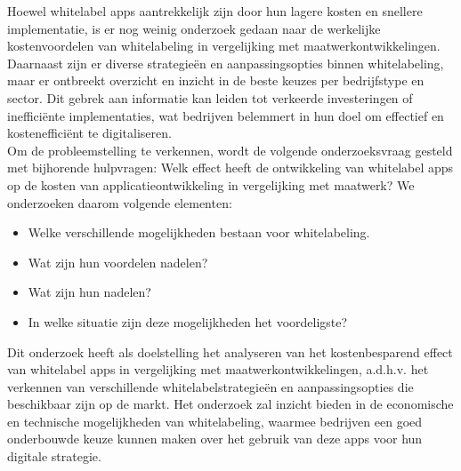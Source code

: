 Hoewel whitelabel apps aantrekkelijk zijn door hun lagere kosten en snellere implementatie, is er nog weinig onderzoek gedaan naar de werkelijke kostenvoordelen van whitelabeling in vergelijking met maatwerkontwikkelingen. 
Daarnaast zijn er diverse strategieën en aanpassingsopties binnen whitelabeling, maar er ontbreekt overzicht en inzicht in de beste keuzes per bedrijfstype en sector. 
Dit gebrek aan informatie kan leiden tot verkeerde investeringen of inefficiënte implementaties, wat bedrijven belemmert in hun doel om effectief en kostenefficiënt te digitaliseren.\\

Om de probleemstelling te verkennen, wordt de volgende onderzoeksvraag gesteld met bijhorende hulpvragen:
Welk effect heeft de ontwikkeling van whitelabel apps op de kosten van applicatieontwikkeling in vergelijking met maatwerk?
We onderzoeken daarom volgende elementen:
\begin{itemize}
  \item Welke verschillende mogelijkheden bestaan voor whitelabeling. 
  \item Wat zijn hun voordelen nadelen?
  \item Wat zijn hun nadelen?
  \item In welke situatie zijn deze mogelijkheden het voordeligste?
\end{itemize}

Dit onderzoek heeft als doelstelling het analyseren van het kostenbesparend effect van whitelabel apps in vergelijking met maatwerkontwikkelingen, 
a.d.h.v. het verkennen van verschillende whitelabelstrategieën en aanpassingsopties die beschikbaar zijn op de markt. 
Het onderzoek zal inzicht bieden in de economische en technische mogelijkheden van whitelabeling, 
waarmee bedrijven een goed onderbouwde keuze kunnen maken over het gebruik van deze apps voor hun digitale strategie.

